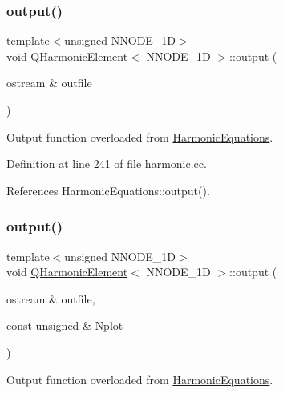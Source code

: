 \subsubsection{\texorpdfstring{output()}{output()}\hspace{0.1cm}{\footnotesize\ttfamily [1/2]}}
{\footnotesize\ttfamily template$<$unsigned N\+N\+O\+D\+E\+\_\+1D$>$ \\
void \hyperlink{classQHarmonicElement}{Q\+Harmonic\+Element}$<$ N\+N\+O\+D\+E\+\_\+1D $>$\+::output (\begin{DoxyParamCaption}\item[{ostream \&}]{outfile }\end{DoxyParamCaption})\hspace{0.3cm}{\ttfamily [inline]}}



Output function overloaded from \hyperlink{classHarmonicEquations}{Harmonic\+Equations}. 



Definition at line 241 of file harmonic.\+cc.



References Harmonic\+Equations\+::output().

\mbox{\label{classQHarmonicElement_a25cda8268943ebba984da16b07544e89}} 
\subsubsection{\texorpdfstring{output()}{output()}\hspace{0.1cm}{\footnotesize\ttfamily [2/2]}}
{\footnotesize\ttfamily template$<$unsigned N\+N\+O\+D\+E\+\_\+1D$>$ \\
void \hyperlink{classQHarmonicElement}{Q\+Harmonic\+Element}$<$ N\+N\+O\+D\+E\+\_\+1D $>$\+::output (\begin{DoxyParamCaption}\item[{ostream \&}]{outfile,  }\item[{const unsigned \&}]{Nplot }\end{DoxyParamCaption})\hspace{0.3cm}{\ttfamily [inline]}}



Output function overloaded from \hyperlink{classHarmonicEquations}{Harmonic\+Equations}. 



